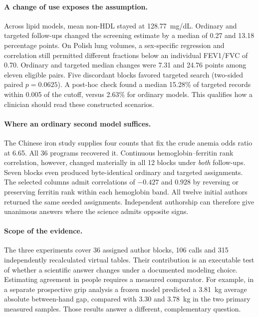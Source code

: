 \documentclass[sigconf,anonymous,nonacm]{acmart}
\begin{document}
\paragraph{A change of use exposes the assumption.}
Across lipid models, mean non-HDL stayed at 128.77~mg/dL. Ordinary and targeted follow-ups changed the screening estimate by a median of 0.27 and 13.18 percentage points. On Polish lung volumes, a sex-specific regression and correlation still permitted different fractions below an individual FEV1/FVC of 0.70. Ordinary and targeted median changes were 7.31 and 24.76 points among eleven eligible pairs. Five discordant blocks favored targeted search (two-sided paired \(p=0.0625\)). A post-hoc check found a median 15.28\% of targeted records within 0.005 of the cutoff, versus 2.63\% for ordinary models. This qualifies how a clinician should read these constructed scenarios.

\paragraph{Where an ordinary second model suffices.}
The Chinese iron study supplies four counts that fix the crude anemia odds ratio at 6.65. All 36 programs recovered it. Continuous hemoglobin--ferritin rank correlation, however, changed materially in all 12 blocks under \emph{both} follow-ups. Seven blocks even produced byte-identical ordinary and targeted assignments. The selected columns admit correlations of \(-0.427\) and \(0.928\) by reversing or preserving ferritin rank within each hemoglobin band. All twelve initial authors returned the same seeded assignments. Independent authorship can therefore give unanimous answers where the science admits opposite signs.

\paragraph{Scope of the evidence.}
The three experiments cover 36 assigned author blocks, 106 calls and 315 independently recalculated virtual tables. Their contribution is an executable test of whether a scientific answer changes under a documented modeling choice. Estimating agreement in people requires a measured comparator. For example, in a separate prospective grip analysis a frozen model predicted a 3.81~kg average absolute between-hand gap, compared with 3.30 and 3.78~kg in the two primary measured samples. Those results answer a different, complementary question.
\end{document}
